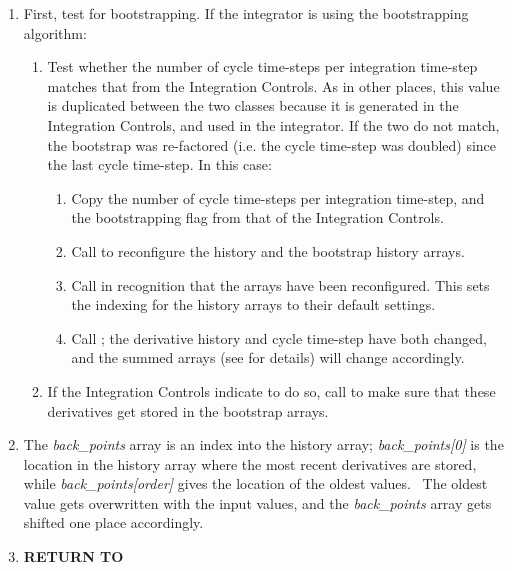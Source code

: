 \begin{enumerate}
\item First, test for bootstrapping. If the integrator is using the
bootstrapping algorithm:

\begin{enumerate}
\item Test whether the number of cycle time-steps per integration
time-step matches that from the Integration Controls. As in other
places, this value is duplicated between the two classes because it is
generated in the Integration Controls, and used in the integrator. If
the two do not match, the bootstrap was re-factored (i.e. the cycle
time-step was doubled) since the last cycle time-step. In this case:

\begin{enumerate}
\item Copy the number of cycle time-steps per integration time-step, and
the bootstrapping flag from that of the Integration Controls.
\item Call  to
reconfigure the history and the bootstrap history arrays.
\item Call  in
recognition that the arrays have been reconfigured. This sets the indexing for
the history arrays to their default settings.
\item Call ;
the derivative history
and cycle time-step have both changed, and the summed arrays (see
 for details)
will change accordingly.
\end{enumerate}
\item If the Integration Controls indicate to do so, call
to make sure that these derivatives get stored in the bootstrap arrays.
\end{enumerate}
\item The \textit{back\_points} array is an index into the history
array; \textit{back\_points[0]} is the location in the history array
where the most recent derivatives are stored, while
\textit{back\_points[order]} gives the location of the oldest values.
\ The oldest value gets overwritten with the input values, and the
\textit{back\_points} array gets shifted one place accordingly.
\item {\bfseries RETURN TO} 
\end{enumerate}


